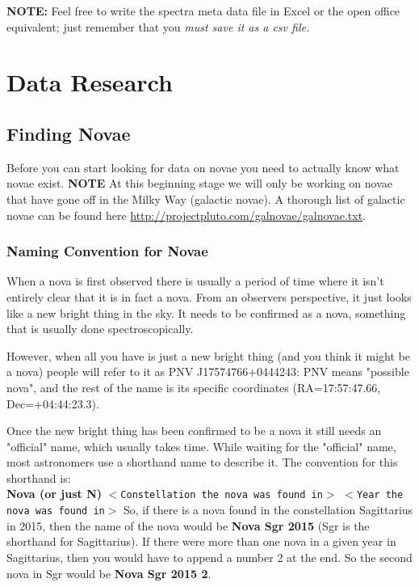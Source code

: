 \documentclass{article}
\begin{document}
\textbf{NOTE:} Feel free to write the spectra meta data file in Excel or the open office equivalent; just remember that you \emph{must save it as a csv file.}









\section{Data Research}
\subsection{Finding Novae}
Before you can start looking for data on novae you need to actually know what novae exist. \textbf{NOTE} At this beginning stage we will only be working on novae that have gone off in the Milky Way (galactic novae). A thorough list of galactic novae can be found here \url{http://projectpluto.com/galnovae/galnovae.txt}. 

\subsubsection{Naming Convention for Novae}
When a nova is first observed there is usually a period of time where it isn't entirely clear that it is in fact a nova. From an observers perspective, it just looks like a new bright thing in the sky. It needs to be confirmed as a nova, something that is usually done spectroscopically.

However, when all you have is just a new bright thing (and you think it might be a nova) people will refer to it as PNV J17574766+0444243: PNV means "possible nova", and the rest of the name is its specific coordinates (RA=17:57:47.66, Dec=+04:44:23.3).

Once the new bright thing has been confirmed to be a nova it still needs an "official" name, which usually takes time. While waiting for the "official" name, most astronomers use a shorthand name to describe it. The convention for this shorthand is:\\

\noindent
\textbf{Nova (or just N)} $<$\texttt{Constellation the nova was found in}$>$ $<$\texttt{Year the nova was found in}$>$ 
So, if there is a nova found in the constellation Sagittarius in 2015, then the name of the nova would be \textbf{Nova Sgr 2015} (Sgr is the shorthand for Sagittarius). If there were more than one nova in a given year in Sagittarius, then you would have to append a number 2 at the end. So the second nova in Sgr would be \textbf{Nova Sgr 2015 2}. 
\end{document}
